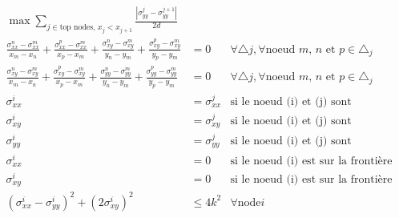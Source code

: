 \begin{align}
\max \sum_{j \in \text{top nodes, $x_j < x_{j+1}$}} \frac{|\sigma_{yy}^j - \sigma_{yy}^{j+1}|}{2 d } & \\
\frac{\sigma_{xx}^n - \sigma_{xx}^m}{x_m - x_n}  + \frac{\sigma_{xx}^p - \sigma_{xx}^m}{x_p - x_m} + \frac{\sigma_{xy}^n - \sigma_{xy}^m}{y_n - y_m} + \frac{\sigma_{xy}^p - \sigma_{xy}^m}{y_p - y_m} &= 0  & \forall \triangle j, \forall \text{noeud $m$, $n$ et $p$} \in \triangle_j \\
\frac{\sigma_{xy}^n - \sigma_{xy}^m}{x_m - x_n}  + \frac{\sigma_{xy}^p - \sigma_{xy}^m}{x_p - x_m} + \frac{\sigma_{yy}^n - \sigma_{yy}^m}{y_n - y_m} + \frac{\sigma_{yy}^p - \sigma_{yy}^m}{y_p - y_m} &= 0  & \forall \triangle j, \forall \text{noeud $m$, $n$ et $p$} \in \triangle_j \\
\sigma_{xx}^i &= \sigma_{xx}^j & \text{si le noeud (i) et (j) sont confondus}\\
\sigma_{xy}^i &= \sigma_{xy}^j & \text{si le noeud (i) et (j) sont confondus}\\
\sigma_{yy}^i &= \sigma_{yy}^j & \text{si le noeud (i) et (j) sont confondus}\\
\sigma_{xx}^i &= 0 & \text{si le noeud (i) est sur la frontière} \\
\sigma_{xy}^i &= 0 & \text{si le noeud (i) est sur la frontière}\\
(\sigma_{xx}^i - \sigma_{yy}^i)^2 + (2 \sigma_{xy}^i)^2 & \leq 4 k^2 & \forall \text{node} i
\end{align}





